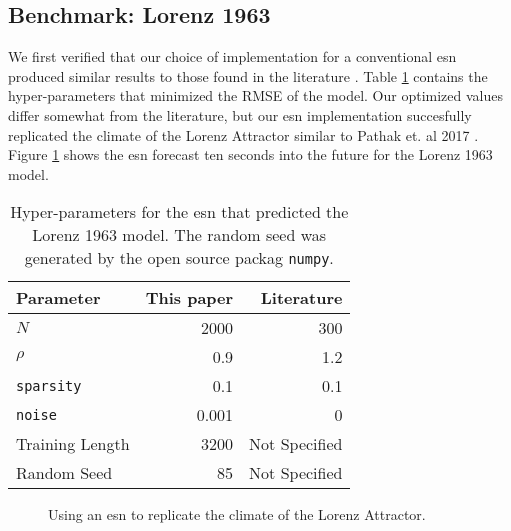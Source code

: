 \subsection{Benchmark: Lorenz 1963}

We first verified that our choice of implementation for a conventional \gls{esn}
produced similar results to those found in the literature
\cite{pathak_using_2017}. Table \ref{tab:lorenzparam} contains the hyper-parameters
that minimized the RMSE of the model. Our optimized values differ
somewhat from the literature, but our \gls{esn} implementation
succesfully replicated the climate of the Lorenz Attractor similar to Pathak
et. al 2017 \cite{pathak_using_2017}. Figure \ref{fig:lorenz63} shows the
\gls{esn} forecast ten seconds into the future for the Lorenz 1963 model.


\begin{table}[h]
  \centering
  \caption{Hyper-parameters for the \gls{esn} that predicted the Lorenz 1963
  model. The random seed was generated by the open source packag
  \texttt{numpy}.}
  \label{tab:lorenzparam}
  \begin{tabular}{l r r}
    \hline
    Parameter & This paper & Literature \cite{pathak_using_2017}\\
    \hline
    $N$ & 2000& 300\\
    $\rho$& 0.9&1.2\\
    \texttt{sparsity}& 0.1& 0.1\\
    \texttt{noise}& 0.001& 0\\
    Training Length & 3200& Not Specified\\
    Random Seed & 85 & Not Specified\\
    \hline
  \end{tabular}
\end{table}
\begin{figure}[h]
  \centering
  
  \caption{Using an \gls{esn} to replicate the climate of the Lorenz Attractor.}
  \label{fig:lorenz63}
\end{figure}
